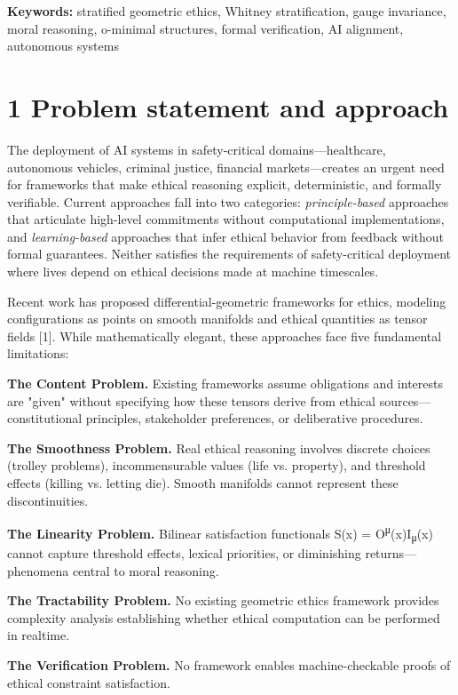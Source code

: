 \documentclass[12pt]{article}
\theoremstyle{plain}
\theoremstyle{definition}
\theoremstyle{remark}
\begin{document}
\noindent\textbf{Keywords:} stratified geometric ethics, Whitney stratification, gauge invariance, moral reasoning, o-minimal structures, formal verification, AI alignment, autonomous systems

\section{1 Problem statement and
approach}\label{problem-statement-and-approach}

The deployment of AI systems in safety-critical domains---healthcare,
autonomous vehicles, criminal justice, financial markets---creates an
urgent need for frameworks that make ethical reasoning explicit,
deterministic, and formally verifiable. Current approaches fall into two
categories: \emph{principle-based} approaches that articulate high-level
commitments without computational implementations, and
\emph{learning-based} approaches that infer ethical behavior from
feedback without formal guarantees. Neither satisfies the requirements
of safety-critical deployment where lives depend on ethical decisions
made at machine timescales.

Recent work has proposed differential-geometric frameworks for ethics,
modeling configurations as points on smooth manifolds and ethical
quantities as tensor fields {[}1{]}. While mathematically elegant, these
approaches face five fundamental limitations:

\textbf{The Content Problem.} Existing frameworks assume obligations and
interests are "given" without specifying how these tensors derive from
ethical sources---constitutional principles, stakeholder preferences, or
deliberative procedures.

\textbf{The Smoothness Problem.} Real ethical reasoning involves
discrete choices (trolley problems), incommensurable values (life vs.
property), and threshold effects (killing vs. letting die). Smooth
manifolds cannot represent these discontinuities.

\textbf{The Linearity Problem.} Bilinear satisfaction functionals S(x) =
O\textsuperscript{μ}(x)I\textsubscript{μ}(x) cannot capture threshold
effects, lexical priorities, or diminishing returns---phenomena central
to moral reasoning.

\textbf{The Tractability Problem.} No existing geometric ethics
framework provides complexity analysis establishing whether ethical
computation can be performed in realtime.

\textbf{The Verification Problem.} No framework enables
machine-checkable proofs of ethical constraint satisfaction.
\end{document}
